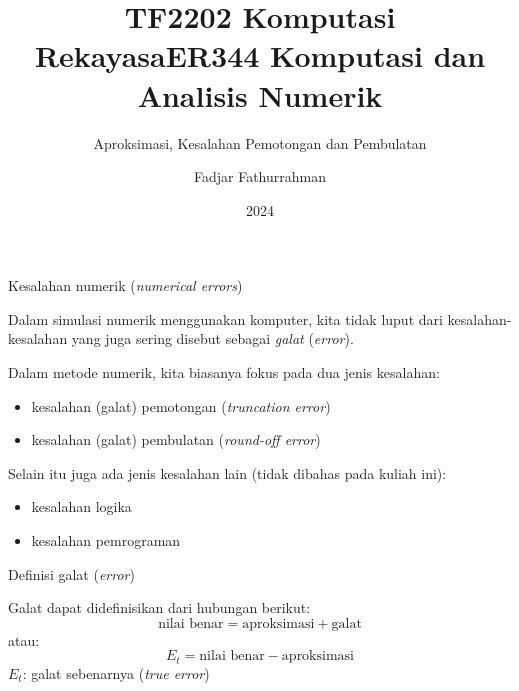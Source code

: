 

\title{TF2202 Komputasi Rekayasa}
\title{ER344 Komputasi dan Analisis Numerik}
\subtitle{Aproksimasi, Kesalahan Pemotongan dan Pembulatan}
\author{Fadjar Fathurrahman}
\date{2024}



\frame{\titlepage}

\begin{frame}{Kesalahan numerik (\textit{numerical errors})}

Dalam simulasi numerik menggunakan komputer, kita tidak luput dari
kesalahan-kesalahan yang juga sering disebut sebagai
\emph{galat} (\emph{error}).

Dalam metode numerik, kita biasanya fokus pada dua jenis kesalahan:
\begin{itemize}\tightlist
\item kesalahan (galat) pemotongan (\textit{truncation error})
\item kesalahan (galat) pembulatan (\textit{round-off error})
\end{itemize}

Selain itu juga ada jenis kesalahan lain (tidak dibahas
pada kuliah ini):
\begin{itemize}
\item kesalahan logika
\item kesalahan pemrograman
\end{itemize}

\end{frame}



\begin{frame}{Definisi galat (\textit{error})}

Galat dapat didefinisikan dari hubungan berikut:
\begin{equation*}
\text{nilai benar} = \text{aproksimasi} + \text{galat}
\end{equation*}
atau:
\begin{equation*}
E_{t} = \text{nilai benar} - \text{aproksimasi}
\end{equation*}
$E_t$: galat sebenarnya (\textit{true error})

\end{frame}


